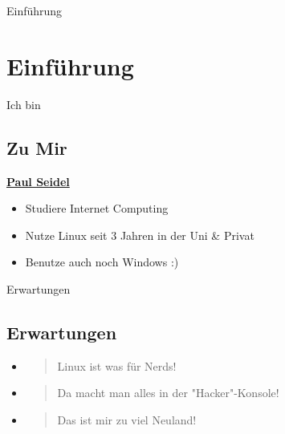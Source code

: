 
\begin{frame}{Einführung}
    \section{Einführung}\label{sec:einfuhrung}

\end{frame}

\begin{frame}{Ich bin}
    \subsection{Zu Mir}\label{subsec:zu-mir}

    \underline{\textbf{Paul Seidel}}

    \begin{itemize}
        \item Studiere Internet Computing
        \item Nutze Linux seit 3 Jahren in der Uni \& Privat
        \item Benutze auch noch Windows :)
    \end{itemize}

\end{frame}

\begin{frame}{Erwartungen}
    \subsection{Erwartungen}\label{subsec:erwartungen}

    \begin{itemize}
        \item \begin{quote}
                  Linux ist was für Nerds!
        \end{quote}\pause
        \item \begin{quote}
                  Da macht man alles in der "Hacker"-Konsole!
        \end{quote}\pause
        \item \begin{quote}
                  Das ist mir zu viel Neuland!
        \end{quote}
    \end{itemize}

\end{frame}

